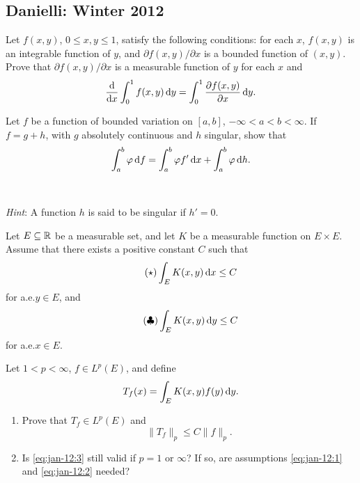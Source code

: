 \subsection{Danielli: Winter 2012}
\setcounter{exercise}{0}
\setcounter{equation}{0}

\begin{problem}
  Let \(f(x,y)\), \(0\leq x,y\leq 1\), satisfy the following conditions:
  for each \(x\), \(f(x,y)\) is an integrable function of \(y\), and
  \(\partial f(x,y)/\partial x\) is a bounded function of \((x,y)\). Prove
  that \(\partial f(x,y)/\partial x\) is a measurable function of \(y\) for
  each \(x\) and
  \[
    \frac{\mathrm{d}}{\mathrm{d} x}\int_0^1f(x,y)\mathop{}\!\mathrm{d} y= \int_0^1\frac{\partial
      f(x,y)}{\partial x}\mathop{}\!\mathrm{d} y.
  \]
\end{problem}
\begin{solution}
\end{solution}

\begin{problem}
  Let \(f\) be a function of bounded variation on \([a,b]\),
  \(-\infty<a<b<\infty\). If \(f=g+h\), with \(g\) absolutely continuous
  and \(h\) singular, show that
  \[
    \int_a^b\varphi\mathop{}\!\mathrm{d} f=\int_a^b\varphi f'\mathop{}\!\mathrm{d} x+\int_a^b\varphi\mathop{}\!\mathrm{d}
    h.
  \]
  \\\\
  \emph{Hint}: A function \(h\) is said to be singular if \(h'=0\).
\end{problem}
\begin{solution}
\end{solution}

\begin{problem}
  Let \(E\subseteq\mathbb{R}\) be a measurable set, and let \(K\) be a measurable
  function on \(E\times E\). Assume that there exists a positive constant
  \(C\) such that
  \[
    \label{eq:jan-12:1}
    \tag{\(\bigstar\)}
    \int_E K(x,y)\diff x\leq C
  \]
  for a.e.\@ \(y\in E\), and
  \[
    \label{eq:jan-12:2}
    \tag{\(\clubsuit\)}
    \int_E K(x,y)\mathop{}\!\mathrm{d} y\leq C
  \]
  for a.e.\@ \(x\in E\).

  Let \(1<p<\infty\), \(f\in L^p(E)\), and define
  \[
    T_f(x)=\int_E K(x,y)f(y)\mathop{}\!\mathrm{d} y.
  \]
  \begin{enumerate}[label=(\alph*),noitemsep]
  \item Prove that \(T_f\in L^p(E)\) and
    \[
      \label{eq:jan-12:3}
      \tag{\(\spadesuit\)}
      \|T_f\|_p\leq C\|f\|_p.
    \]
  \item Is \eqref{eq:jan-12:3} still valid if \(p=1\) or \(\infty\)? If so,
    are assumptions \eqref{eq:jan-12:1} and \eqref{eq:jan-12:2} needed?
  \end{enumerate}
\end{problem}
\begin{solution}
\end{solution}

